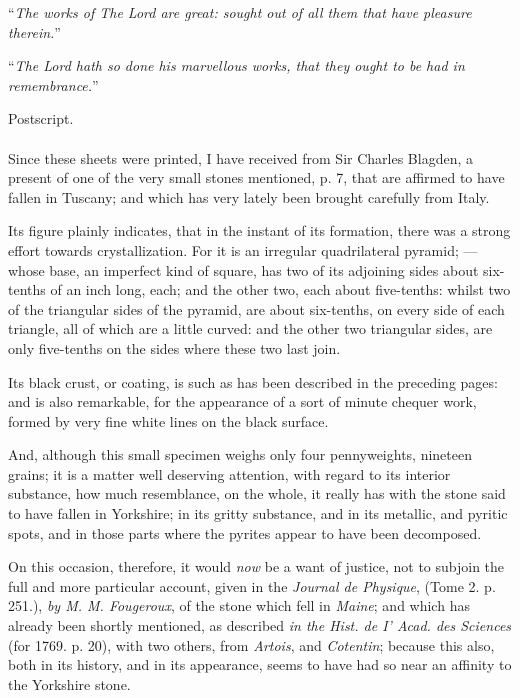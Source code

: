 \documentclass[a4paper, 12pt, oneside, twocolumn]{article}
\begin{document}
``\emph{The works of The Lord are great: sought out of all them that have pleasure therein.}''

``\emph{The Lord hath so done his marvellous works, that they ought to be had in remembrance.}''
\clearpage
\begin{center}
Postscript.
\end{center}
\paragraph{}
Since these sheets were printed, I have received from Sir Charles Blagden, a present of one of the very small stones mentioned, p. 7, that are affirmed to have fallen in Tuscany; and which has very lately been brought carefully from Italy.

Its figure plainly indicates, that in the instant of its formation, there was a strong effort towards crystallization. For it is an irregular quadrilateral pyramid; --- whose base, an imperfect kind of square, has two of its adjoining sides about six-tenths of an inch long, each; and the other two, each about five-tenths: whilst two of the triangular sides of the pyramid, are about six-tenths, on every side of each triangle, all of which are a little curved: and the other two triangular sides, are only five-tenths on the sides where these two last join.

Its black crust, or coating, is such as has been described in the preceding pages: and is also remarkable, for the appearance of a sort of minute chequer work, formed by very fine white lines on the black surface.

And, although this small specimen weighs only four pennyweights, nineteen grains; it is a matter well deserving attention, with regard to its interior substance, how much resemblance, on the whole, it really has with the stone said to have fallen in Yorkshire; in its gritty substance, and in its metallic, and pyritic spots, and in those parts where the pyrites appear to have been decomposed.

On this occasion, therefore, it would \emph{now} be a want of justice, not to subjoin the full and more particular account, given in the \emph{Journal de Physique}, (Tome 2. p. 251.), \emph{by M. M. Fougeroux}, of the stone which fell in \emph{Maine}; and which has already been shortly mentioned, as described \emph{in the Hist. de I' Acad. des Sciences} (for 1769. p. 20), with two others, from \emph{Artois}, and \emph{Cotentin}; because this also, both in its history, and in its appearance, seems to have had so near an affinity to the Yorkshire stone.
\end{document}
